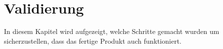 \section{Validierung}\label{sec:validierung}
In diesem Kapitel wird aufgezeigt, welche Schritte gemacht wurden um sicherzustellen, dass das fertige Produkt auch funktioniert.